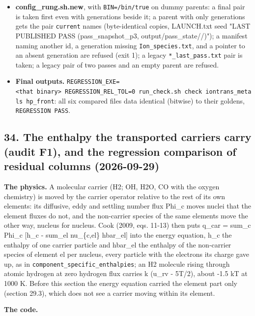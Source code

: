 \documentclass[english,a4paper]{my_memo}
\begin{document}
\begin{itemize}
\item
  \textbf{config\_rung.sh.new}, with \texttt{BIN=/bin/true} on dummy parents: a final
  pair is taken first even with generations beside it; a parent with only
  generations gets the pair \texttt{current} names (byte-identical copies, LAUNCH.txt
  seed "LAST PUBLISHED PASS (pass\_snapshot\_p3, output/pass\_state//)");
  a manifest naming another id, a generation missing \texttt{Ion\_species.txt}, and a
  pointer to an absent generation are refused (exit 1); a legacy
  \texttt{*\_last\_pass.txt} pair is taken; a legacy pair of two passes and an empty
  parent are refused.
\item
  \textbf{Final outputs.} \texttt{REGRESSION\_EXE=\textless{}that\ binary\textgreater{}\ REGRESSION\_REL\_TOL=0\ run\_check.sh\ check\ iontrans\_metals\ hp\_front}: all six compared files data
  identical (bitwise) to their goldens, \texttt{REGRESSION\ PASS}.
\end{itemize}

\subsection{34. The enthalpy the transported carriers carry (audit F1), and the regression comparison of residual columns (2026-09-29)}\label{34-the-enthalpy-the-transported-carriers-carry-audit-f1-and-the-regression-comparison-of-residual-columns-2026-09-29}

\textbf{The physics.} A molecular carrier (H2; OH, H2O, CO with the oxygen
chemistry) is moved by the carrier operator relative to the rest of its own
elements: its diffusive, eddy and settling number flux Phi\_c moves nuclei
that the element fluxes do not, and the non-carrier species of the same
elements move the other way, nucleus for nucleus. Cook (2009, eqs. 11-13)
then puts q\_car = sum\_c Phi\_c {[}h\_c - sum\_el nu\_\{c,el\} hbar\_el{]} into the
energy equation, h\_c the enthalpy of one carrier particle and hbar\_el the
enthalpy of the non-carrier species of element el per nucleus, every
particle with the electrons its charge gave up, as in
\texttt{component\_specific\_enthalpies}; an H2 molecule rising through atomic
hydrogen at zero hydrogen flux carries k (u\_rv - 5T/2), about -1.5 kT at
1000 K. Before this section the energy equation carried the element part
only (section 29.3), which does not see a carrier moving within its element.

\textbf{The code.}
\end{document}
